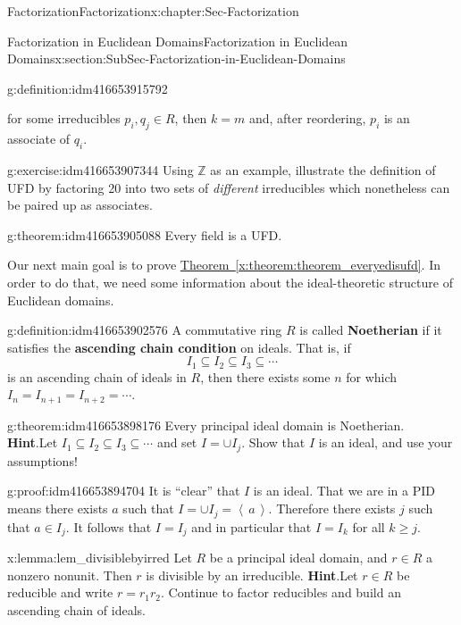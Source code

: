 \documentclass[oneside,10pt,]{book}
\newcommand{\terminology}[1]{\textbf{#1}}
\numberwithin{equation}{section}
\renewcommand{\geq}{\geqslant}
\newcommand{\ideal}[1]{\left\langle\, #1 \,\right\rangle}
\def\Z{{\mathbb Z}}
\begin{document}
\begin{chapterptx}{Factorization}{}{Factorization}{}{}{x:chapter:Sec-Factorization}
\begin{sectionptx}{Factorization in Euclidean Domains}{}{Factorization in Euclidean Domains}{}{}{x:section:SubSec-Factorization-in-Euclidean-Domains}
\begin{definition}{}{g:definition:idm416653915792}
\begin{enumerate}
\begin{equation*}
\end{equation*}
for some irreducibles \(p_i, q_j\in R\), then \(k=m\) and, after reordering, \(p_i\) is an associate of \(q_i\).%
\end{enumerate}
%
\end{definition}
\begin{inlineexercise}{}{g:exercise:idm416653907344}%
Using \(\Z\) as an example, illustrate the definition of UFD by factoring 20 into two sets of \emph{different} irreducibles which nonetheless can be paired up as associates.%
\end{inlineexercise}
\begin{theorem}{}{}{g:theorem:idm416653905088}%
Every field is a UFD.%
\end{theorem}
Our next main goal is to prove \hyperref[x:theorem:theorem_everyedisufd]{Theorem~\ref{x:theorem:theorem_everyedisufd}}. In order to do that, we need some information about the ideal-theoretic structure of Euclidean domains.%
\begin{definition}{}{g:definition:idm416653902576}%
A commutative ring \(R\) is called \terminology{Noetherian} if it satisfies the \terminology{ascending chain condition} on ideals. That is, if%
\begin{equation*}
I_1 \subseteq I_2\subseteq I_3\subseteq \cdots
\end{equation*}
is an ascending chain of ideals in \(R\), then there exists some \(n\) for which \(I_n = I_{n+1} = I_{n+2} = \cdots\).%
\end{definition}
\begin{theorem}{}{}{g:theorem:idm416653898176}%
Every principal ideal domain is Noetherian.%
\textbf{Hint}.\quad{}Let \(I_1\subseteq I_2\subseteq I_3 \subseteq \cdots\) and set \(I = \cup I_j\). Show that \(I\) is an ideal, and use your assumptions!%
\end{theorem}
\begin{proofptx}{}{g:proof:idm416653894704}
It is ``clear'' that \(I\) is an ideal. That we are in a PID means there exists \(a\) such that \(I=\cup I_j=\ideal{a}\). Therefore there exists \(j\) such that \(a\in I_j\). It follows that \(I=I_j\) and in particular that \(I=I_k\) for all \(k\geq j\).%
\end{proofptx}
\begin{lemma}{}{}{x:lemma:lem_divisiblebyirred}%
Let \(R\) be a principal ideal domain, and \(r\in R\) a nonzero nonunit. Then \(r\) is divisible by an irreducible.%
\textbf{Hint}.\quad{}Let \(r\in R\) be reducible and write \(r = r_1 r_2\). Continue to factor reducibles and build an ascending chain of ideals.%

\end{lemma}
\end{sectionptx}
\end{chapterptx}
\end{document}
